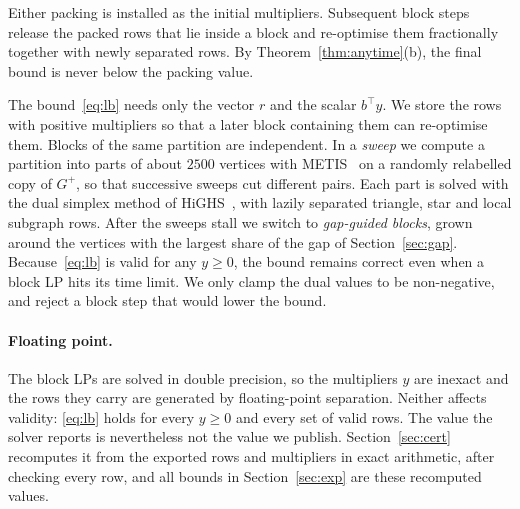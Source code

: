 Either packing is installed as the initial multipliers.  Subsequent
block steps release the packed rows that lie inside a block and re-optimise
them fractionally together with newly separated rows.  By
Theorem~\ref{thm:anytime}(b), the final bound is never below the packing
value.

The bound~\eqref{eq:lb} needs only the vector $r$ and the scalar $b^\top y$.
We store the rows with positive multipliers so that a later block containing
them can re-optimise them.  Blocks of the same partition are independent.
In a \emph{sweep} we compute a partition into parts of about $2500$ vertices
with METIS~\citep{KarypisK98} on a randomly relabelled copy of $G^+$, so that
successive sweeps cut different pairs.  Each part is solved with the dual
simplex method of HiGHS~\citep{HuangfuH18}, with lazily separated triangle,
star and local subgraph rows.  After the sweeps stall we switch to
\emph{gap-guided blocks}, grown around the vertices with the largest share of
the gap of Section~\ref{sec:gap}.  Because~\eqref{eq:lb} is valid for any $y\ge0$, the
bound remains correct even when a block LP hits its time limit.  We only
clamp the dual values to be non-negative, and reject a block step that would
lower the bound.

\paragraph{Floating point.}  The block LPs are solved in double precision,
so the multipliers $y$ are inexact and the rows they carry are generated by
floating-point separation.  Neither affects validity: \eqref{eq:lb} holds for
every $y\ge0$ and every set of valid rows.  The value the solver reports is
nevertheless not the value we publish.  Section~\ref{sec:cert} recomputes it
from the exported rows and multipliers in exact arithmetic, after checking
every row, and all bounds in Section~\ref{sec:exp} are these recomputed
values.

